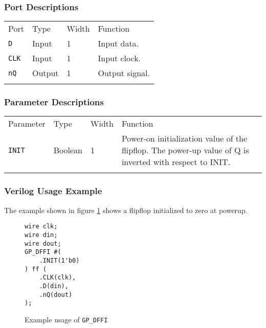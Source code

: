 \documentclass[11pt]{article}
\newcommand{\tokenstyle}[1]{\texttt{#1}}
\newcommand{\whenstyle}[1]{{\fontseries{sb}\selectfont#1}}
\newcommand{\thinhline}{\Xhline{1\arrayrulewidth}}
\newcommand{\thickhline}{\Xhline{2.5\arrayrulewidth}}
\begin{document}
\subsubsection{Port Descriptions}

\begin{tabularx}{\textwidth}{lllX}
\thinhline
\whenstyle{Port} & \whenstyle{Type} & \whenstyle{Width} & \whenstyle{Function} \\
\thickhline
\tokenstyle{D} & Input & 1 & Input data. \\
\thinhline
\tokenstyle{CLK} & Input & 1 & Input clock. \\
\thinhline
\tokenstyle{nQ} & Output & 1 & Output signal. \\
\thinhline
\end{tabularx}

\subsubsection{Parameter Descriptions}

\begin{tabularx}{\textwidth}{lllX}
\thinhline
\whenstyle{Parameter} & \whenstyle{Type} & \whenstyle{Width} & \whenstyle{Function} \\
\thickhline
\tokenstyle{INIT} & Boolean & 1 & Power-on initialization value of the flipflop. \newline The power-up value of Q is inverted
with respect to INIT.\\
\thinhline
\end{tabularx}

\subsubsection{Verilog Usage Example}

The example shown in figure \ref{gp-dffi-example} shows a flipflop initialized to zero at powerup.

\begin{figure}[h]
\begin{lstlisting}
wire clk;
wire din;
wire dout;
GP_DFFI #(
	.INIT(1'b0)
) ff (
	.CLK(clk),
	.D(din),
	.nQ(dout)
);
\end{lstlisting}
\caption{Example usage of \tokenstyle{GP\_DFFI}}
\label{gp-dffi-example}
\end{figure}

\end{document}
